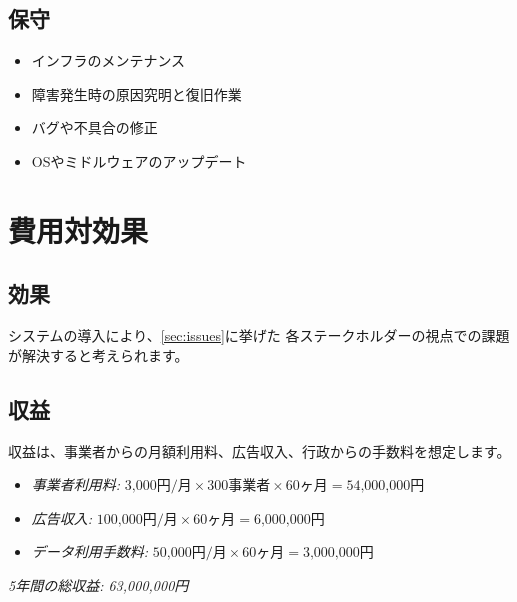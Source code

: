 \documentclass{docs}
\begin{document}
\subsection{保守}
\begin{itemize}
	\item インフラのメンテナンス
	\item 障害発生時の原因究明と復旧作業
	\item バグや不具合の修正
	\item OSやミドルウェアのアップデート
\end{itemize}

\section{費用対効果}
\subsection{効果}
システムの導入により、\cref{sec:issues}に挙げた
各ステークホルダーの視点での課題が解決すると考えられます。

\subsection{収益}
収益は、事業者からの月額利用料、広告収入、行政からの手数料を想定します。
\begin{itemize}
	\item \emph{事業者利用料:} $\text{3,000円/月}\times\text{300事業者}
	\times\text{60ヶ月}=\text{54,000,000円}$
	\item \emph{広告収入:} $\text{100,000円/月}\times\text{60ヶ月}
	=\text{6,000,000円}$
	\item \emph{データ利用手数料:} $\text{50,000円/月}\times\text{60ヶ月}
	=\text{3,000,000円}$
\end{itemize}
\emph{5年間の総収益: 63,000,000円}
\end{document}
